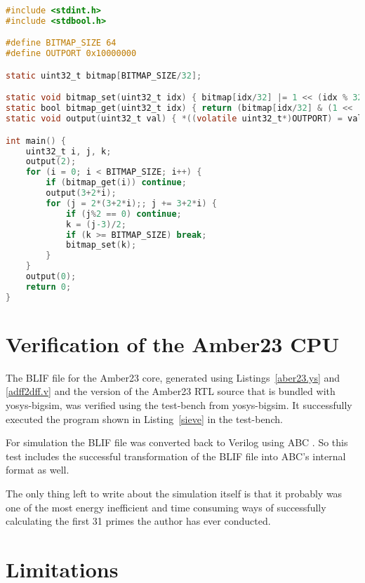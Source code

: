\documentclass[9pt,technote,a4paper]{IEEEtran}
\begin{document}
\begin{figure*}
\begin{lstlisting}[language=C]
#include <stdint.h>
#include <stdbool.h>

#define BITMAP_SIZE 64
#define OUTPORT 0x10000000

static uint32_t bitmap[BITMAP_SIZE/32];

static void bitmap_set(uint32_t idx) { bitmap[idx/32] |= 1 << (idx % 32); }
static bool bitmap_get(uint32_t idx) { return (bitmap[idx/32] & (1 << (idx % 32))) != 0; }
static void output(uint32_t val) { *((volatile uint32_t*)OUTPORT) = val; }

int main() {
	uint32_t i, j, k;
	output(2);
	for (i = 0; i < BITMAP_SIZE; i++) {
		if (bitmap_get(i)) continue;
		output(3+2*i);
		for (j = 2*(3+2*i);; j += 3+2*i) {
			if (j%2 == 0) continue;
			k = (j-3)/2;
			if (k >= BITMAP_SIZE) break;
			bitmap_set(k);
		}
	}
	output(0);
	return 0;
}
\end{lstlisting}
\renewcommand{\figurename}{Listing}
\caption{Test program for the Amber23 CPU (Sieve of Eratosthenes). Compiled using
GCC 4.6.3 for ARM with {\tt -Os -marm -march=armv2a -mno-thumb-interwork
-ffreestanding}, linked with {\tt -{}-fix-v4bx} set and booted with a custom
setup routine written in ARM assembler.}
\label{sieve}
\end{figure*}

\section{Verification of the Amber23 CPU}

The BLIF file for the Amber23 core, generated using Listings~\ref{aber23.ys}
and \ref{adff2dff.v} and the version of the Amber23 RTL source that is bundled
with yosys-bigsim, was verified using the test-bench from yosys-bigsim.
It successfully executed the program shown in Listing~\ref{sieve} in the
test-bench.

For simulation the BLIF file was converted back to Verilog using ABC
\cite{ABC}. So this test includes the successful transformation of the BLIF
file into ABC's internal format as well.

The only thing left to write about the simulation itself is that it probably
was one of the most energy inefficient and time consuming ways of successfully
calculating the first 31 primes the author has ever conducted.

\section{Limitations}
\end{document}

